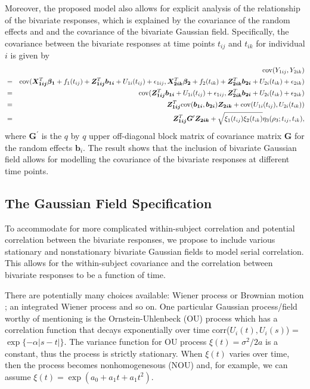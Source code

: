 \documentclass[review]{elsarticle}
\begin{document}
Moreover, the proposed model also allows for explicit analysis of the relationship of the bivariate responses, which is explained by the covariance of the random effects and and the covariance of the bivariate Gaussian field. 
Specifically, the covariance between the bivariate responses at time points $t_{ij}$ and $t_{ik}$ for individual $i$ is given by
\begin{eqnarray*}
&&
{\rm cov}(Y_{1ij}, Y_{2ik}) \\&=& 
{\rm cov}(\bm {X_{1ij}}^T\bm{\beta_1} + f_1(t_{ij}) 
+ \bm{Z_{1ij}}^T\bm{b_{1i}} + U_{1i}(t_{ij}) + \epsilon_{1ij}, 
\bm{X_{2ik}}^T\bm{\beta_2} + f_2(t_{ik}) + \bm{Z_{2ik}}^T\bm{b_{2i}} + 
U_{2i}(t_{ik}) + \epsilon_{2ik}) \\
&=& {\rm cov} (\bm{Z_{1ij}}^T\bm{b_{1i}} + U_{1i}(t_{ij}) + \epsilon_{1ij},
\bm{Z_{2ik}}^T\bm{b_{2i}} + U_{2i}(t_{ik}) + \epsilon_{2ik}) \\
&=& \bm{Z_{1ij}}^T {\rm cov} (\bm{b_{1i}}, \bm{b_{2i}})\bm{Z_{2ik}}
+ {\rm cov}(U_{1i}(t_{ij}), U_{2i}(t_{ik})) \\
&=&
\bm{Z_{1ij}}^T \bm G^\prime \bm{Z_{2ik}}
+  \sqrt {\xi_1(t_{ij}) \xi_2(t_{ik})} \eta_3(\rho_3; t_{ij}, t_{ik}),
\end{eqnarray*}
where $\bm G^\prime$ is the $q$ by $q$ upper off-diagonal block matrix of covariance matrix $\bm G$ for the random effects $\bm b_i$. 
The result shows that the inclusion of bivariate Gaussian field  allows for modelling the covariance of the bivariate responses at different time points.

\subsection{The Gaussian Field Specification}

To accommodate for more complicated within-subject correlation and potential correlation between the bivariate responses, we propose to include various stationary and nonstationary bivariate Gaussian fields to model serial correlation. This allows for the within-subject covariance and the correlation between bivariate responses to be a function of time. 

There are potentially many choices available: Wiener process or Brownian motion \citep{Tayl:Cumb:Sy:quan:1994}; an integrated Wiener process and so on. One particular Gaussian process/field worthy of mentioning is the Ornstein-Uhlenbeck (OU) process \citep{Koralov:2007} which has a correlation function that decays exponentially over time corr($U_i(t), U_i(s)$) = $\exp\{-\alpha|s-t|\}$. The variance function for OU process $\xi(t) = \sigma^2/2a$ is a constant, thus the process is strictly stationary. When $\xi(t)$ varies over time, then the process becomes nonhomogenesous (NOU) and, for example, we can assume $\xi(t) = \exp(a_0 + a_1 t + a_1 t^2)$. 
\end{document}
